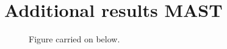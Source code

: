 \chapter{Additional results MAST}





\begin{figure}[h]
  \centering
\caption{Figure carried on below.}    
    \label{fig:dupl-all}
\end{figure}

